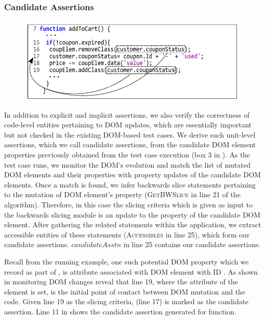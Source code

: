 \subsubsection{Candidate Assertions} \label{Sec:candidateAssertions}
\begin{figure}[!t]
  \centering
  \includegraphics[width=1\hsize]{fig/candidateDOMToCode}
  \vspace{-0.3in} 
  \label{Fig:candidateDOMToCode}
  \vspace{-0.2in} 
\end{figure}
In addition to explicit and implicit assertions, we also verify the correctness of code-level entities pertaining to DOM updates, which are essentially important but not checked in the existing DOM-based test cases. We derive such unit-level assertions, which we call candidate assertions, from the candidate DOM element properties previously obtained from the test case execution (box 3 in ). As the test case runs, we monitor the DOM's evolution and match the list of mutated DOM elements and their properties with property updates of the candidate DOM elements. Once a match is found, we infer backwards slice statements pertaining to the mutation of DOM element's property (\textsc{GetBWSlice} in line 21 of the algorithm). Therefore, in this case the slicing criteria which is given as input to the backwards slicing module is an update to the property of the candidate DOM element.
After gathering the related \javascript statements within the application, we extract accessible entities of these statements (\textsc{Accessibles} in line 25), which form our candidate assertions. $candidateAsstn$ in line 25 contains our candidate assertions. 

Recall from the running example, one such potential DOM property which we record as part of , is  attribute associated with DOM element with ID . As shown in  monitoring DOM changes reveal that line 19, where the  attribute of the element is set, is the initial point of contact between DOM mutation and the \javascript code. Given line 19 as the slicing criteria,  (line 17) is marked as the candidate assertion.
Line 11 in  shows the candidate assertion generated for  function. 